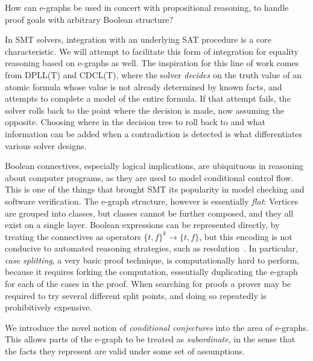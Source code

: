 \begin{researchquestion}How can e-graphs be used in concert with propositional reasoning, to handle proof goals with arbitrary Boolean structure?
\end{researchquestion}

In SMT solvers, integration with an underlying SAT procedure is a core characteristic.
We will attempt to facilitate this form of integration for equality reasoning based on e-graphs as well.
The inspiration for this line of work comes from DPLL(T) and CDCL(T), where the solver \emph{decides} on the truth value of an atomic formula whose value is not already determined by known facts, and attempts to complete a model of the entire formula.
If that attempt fails, the solver rolls back to the point where the decision is made, now assuming the opposite.
Choosing where in the decision tree to roll back to and what information can be added when a contradiction is detected is what differentiates various solver designs.

Boolean connectives, especially logical implications, are ubiquituous in reasoning about computer programs, as they are used to model conditional control flow.
This is one of the things that brought SMT its popularity in model checking and software verification.
The e-graph structure, however is essentially \emph{flat}: Vertices are grouped into classes, but classes cannot be further composed, and they all exist on a single layer.
Boolean expressions can be represented directly, by treating the connectives as operators $\{t,f\}^k\to\{t,f\}$, but this encoding is not conducive to automated reasoning strategies, such as resolution~\cite{resolution-things?}.
In particular, \emph{case splitting}, a very basic proof technique, is computationally hard to perform, because it requires forking the computation, essentially duplicating the e-graph for each of the cases in the proof.
When searching for proofs a prover may be required to try several different split points, and doing so repeatedly is prohibitively expensive.

We introduce the novel notion of \emph{conditional conjectures} into the area of e-graphs.
This allows parts of the e-graph to be treated as \emph{subordinate}, in the sense that the facts they represent are valid under some set of assumptions.


